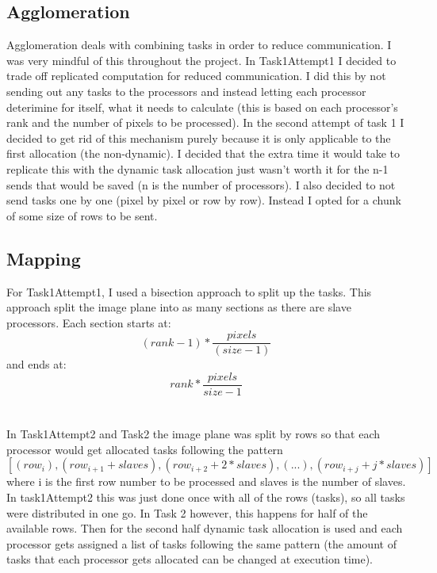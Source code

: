 \documentclass{article}
\begin{document}
    \subsection{Agglomeration}
        Agglomeration deals with combining tasks in order to reduce communication. I was very mindful of this throughout the project. In Task1Attempt1 I decided
        to trade off replicated computation for reduced communication. I did this by not sending out any tasks to the processors and instead letting each processor
        deterimine for itself, what it needs to calculate (this is based on each processor's rank and the number of pixels to be processed). In the second attempt of
        task 1 I decided to get rid of this mechanism purely because it is only applicable to the first allocation (the non-dynamic). I decided that the extra time it would
        take to replicate this with the dynamic task allocation just wasn't worth it for the n-1 sends that would be saved (n is the number of processors). I also decided to
        not send tasks one by one (pixel by pixel or row by row). Instead I opted for a chunk of some size of rows to be sent.
    
    \subsection{Mapping}
        For Task1Attempt1, I used a bisection approach to split up the tasks. This approach split the image plane into as many sections as there are slave processors.
        Each section starts at: \[(rank - 1) * \dfrac{pixels}{(size - 1)}\] and ends at: \[rank * \dfrac{pixels}{size - 1}\]
        \\
        \\
        In Task1Attempt2 and Task2 the image plane was split by rows so that each processor would get allocated tasks following the pattern \([(row_{i}), (row_{i+1} + slaves), (row_{i+2} + 2 * slaves), (...), (row_{i+j} + j * slaves)]\)
        where i is the first row number to be processed and slaves is the number of slaves. In task1Attempt2 this was just done once with all of the rows (tasks), so all tasks were distributed in one go.
        In Task 2 however, this happens for half of the available rows. Then for the second half dynamic task allocation is used and each processor gets assigned a list of tasks following the same pattern (the amount of tasks
        that each processor gets allocated can be changed at execution time).
\end{document}
